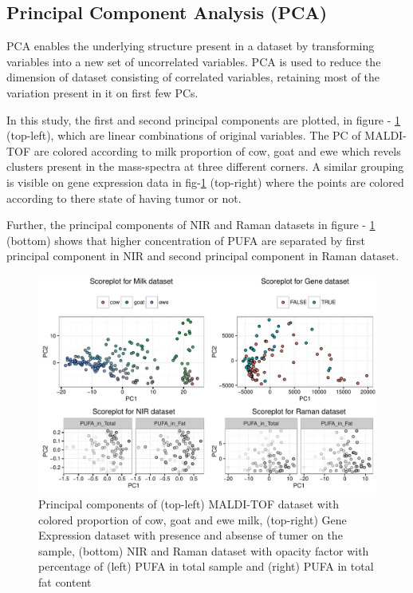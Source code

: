 \documentclass[10pt, a4paper]{article}\usepackage[]{graphicx}\usepackage[]{color}
\makeatletter
\def\maxwidth{ %
  \ifdim\Gin@nat@width>\linewidth
    \linewidth
  \else
    \Gin@nat@width
  \fi
}
\newenvironment{knitrout}{}{} %
\makeatother
\begin{document}
\subsection{Principal Component Analysis (PCA)}
PCA enables the underlying structure present in a dataset by transforming variables into a new set of uncorrelated variables. PCA is used to reduce the dimension of dataset consisting of correlated variables, retaining most of the variation present in it on first few PCs.
  
In this study, the first and second principal components are plotted, in figure - \ref{fig:scorePlots} (top-left), which are linear combinations of original variables. The PC of MALDI-TOF are colored according to milk proportion of cow, goat and ewe which revels clusters present in the mass-spectra at three different corners. A similar grouping is visible on gene expression data in fig-\ref{fig:scorePlots} (top-right) where the points are colored according to there state of having tumor or not.

Further, the principal components of NIR and Raman datasets in figure - \ref{fig:scorePlots} (bottom) shows that higher concentration of PUFA are separated by first principal component in NIR and second principal component in Raman dataset.





\begin{knitrout}\small
{}\color{fgcolor}\begin{figure}[H]
\includegraphics[width=\maxwidth]{figure/scorePlots-1} \caption[Principal components of (top-left) MALDI-TOF dataset with colored proportion of cow, goat and ewe milk, (top-right) Gene Expression dataset with presence and absense of tumer on the sample, (bottom) NIR and Raman dataset with opacity factor with percentage of (left) PUFA in total sample and (right) PUFA in total fat content]{Principal components of (top-left) MALDI-TOF dataset with colored proportion of cow, goat and ewe milk, (top-right) Gene Expression dataset with presence and absense of tumer on the sample, (bottom) NIR and Raman dataset with opacity factor with percentage of (left) PUFA in total sample and (right) PUFA in total fat content}\label{fig:scorePlots}
\end{figure}


\end{knitrout}
\end{document}
